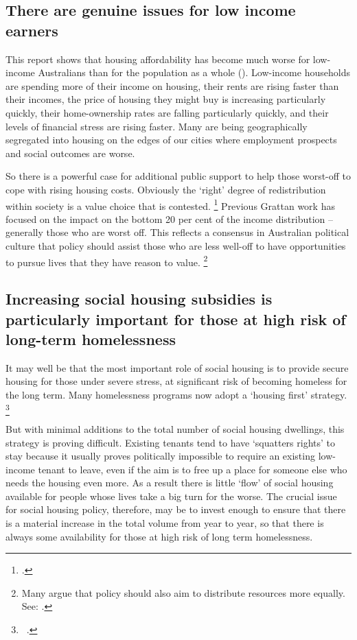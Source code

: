 \subsection{There are genuine issues for low income earners}\label{subsec:there-are-genuine-issues-for-low-incomes}

This report shows that housing affordability has become much worse for low-income Australians than for the population as a whole ().
Low-income households are spending more of their income on housing, their rents are rising faster than their incomes, the price of housing they might buy is increasing particularly quickly, their home-ownership rates are falling particularly quickly, and their levels of financial stress are rising faster. 
Many are being geographically segregated into housing on the edges of our cities where employment prospects and social outcomes are worse.

So there is a powerful case for additional public support to help those worst-off to cope with rising housing costs.
Obviously the `right' degree of redistribution within society is a value choice that is contested.%
    \footcite[][9]{DaleyCoatesWood-2015-Super-tax-targeting}  
Previous Grattan work has focused on the impact on the bottom 20 per cent of the income distribution – generally those who are worst off.
This reflects a consensus in Australian political culture that policy should assist those who are less well-off to have opportunities to pursue lives that they have reason to value.%
    \footnote{Many argue that policy should also aim to distribute resources more equally. See: \textcite[][21]{DaleyEtAl-2013-BalancingBudgets}.}%
    
\subsection{Increasing social housing subsidies is particularly important for those at high risk of long-term homelessness}\label{subsec:Increasing-social-housing-subsidies-is-particularly-important-for-homelessness}

It may well be that the most important role of social housing is to provide secure housing for those under severe stress, at significant risk of becoming homeless for the long term.
Many homelessness programs now adopt a `housing first' strategy.%
    \footnote{\eg~\textcite{Mission_Australia_2014_homelessness}.}
    
But with minimal additions to the total number of social housing dwellings, this strategy is proving difficult.
Existing tenants tend to have `squatters rights' to stay because it usually proves politically impossible to require an existing low-income tenant to leave, even if the aim is to free up a place for someone else who needs the housing even more.
As a result there is little `flow' of social housing available for people whose lives take a big turn for the worse.
The crucial issue for social housing policy, therefore, may be to invest enough to ensure that there is a material increase in the total volume from year to year, so that there is always some availability for those at high risk of long term homelessness.

